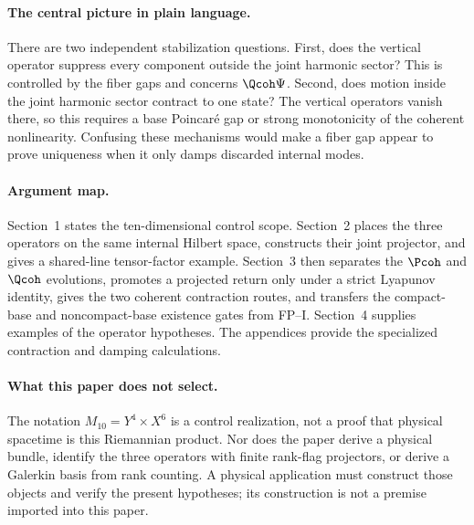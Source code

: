 \documentclass[11pt]{article}
\newcommand{\Mten}{\ensuremath{M_{10}}}
\newcommand{\Yfour}{\ensuremath{Y^{4}}}
\newcommand{\Xsix}{\ensuremath{X^{6}}}
\begin{document}
\paragraph{The central picture in plain language.}
There are two independent stabilization questions.  First, does the vertical
operator suppress every component outside the joint harmonic sector?  This is
controlled by the fiber gaps and concerns $\Qcoh\Psi$.  Second, does motion
inside the joint harmonic sector contract to one state?  The vertical
operators vanish there, so this requires a base Poincar\'e gap or strong
monotonicity of the coherent nonlinearity.  Confusing these mechanisms would
make a fiber gap appear to prove uniqueness when it only damps discarded
internal modes.

\paragraph{Argument map.}
Section~1 states the ten-dimensional control scope.  Section~2 places the
three operators on the same internal Hilbert space, constructs their joint
projector, and gives a shared-line tensor-factor example.  Section~3 then
separates the $\Pcoh$ and $\Qcoh$ evolutions, promotes a projected return only
under a strict Lyapunov identity, gives the two coherent contraction routes,
and transfers the compact-base and noncompact-base existence gates from
FP--I.  Section~4 supplies examples of the operator hypotheses.  The
appendices provide the specialized contraction and damping calculations.

\paragraph{What this paper does not select.}
The notation $\Mten=\Yfour\times\Xsix$ is a control realization, not a proof
that physical spacetime is this Riemannian product.  Nor does the paper derive
a physical bundle, identify the three operators with finite rank-flag
projectors, or derive a Galerkin basis from rank counting. A physical
application must construct those objects and verify the present hypotheses;
its construction is not a premise imported into this paper.

\tableofcontents

\end{document}
